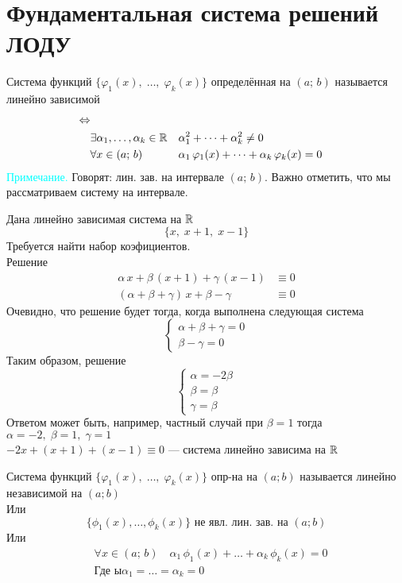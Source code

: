 \section{Фундаментальная система решений ЛОДУ}

\begin{Def}
    Система функций $\{\varphi_1(x),\; \dots, \;\varphi_k(x)\}$ определённая на $(a;\,b)$ называется линейно зависимой
    \begin{align*}
        \Leftrightarrow\\
        &\exists \alpha_1, \dots, \alpha_k \in \mathbb{R}& &\alpha^2_1 + \dots + \alpha^2_k \neq 0\\
        &\forall x \in(a;\,b)& &\alpha_1\,\varphi_1(x)+\dots+\alpha_k\,\varphi_k(x)=0    
    \end{align*}
    \textcolor{cyan}{Примечание.} Говорят: лин. зав. на интервале $(a;\,b)$. Важно отметить, что мы рассматриваем систему на интервале.
\end{Def}

\begin{Example}
    Дана линейно зависимая система на $\mathbb{R}$ 
    \[
        \{x,\; x+1,\; x-1\}
    \]
    Требуется найти набор коэфициентов.\\ 
    Решение
    \begin{align*}
        \alpha\,x+ \beta\,(x+1)+\gamma\,(x-1) &\equiv 0\\
        (\alpha + \beta +\gamma )\,x + \beta - \gamma &\equiv 0
    \end{align*}
    Очевидно, что решение будет тогда, когда выполнена следующая система
    \[
    \begin{cases}
        \alpha + \beta+\gamma=0\\
        \beta - \gamma = 0
    \end{cases}
    \]
    Таким образом, решение
    \[    
    \begin{cases}
        \alpha=-2\beta\\
        \beta=\beta\\
        \gamma = \beta
    \end{cases}
    \]
    Ответом может быть, например, частный случай при $\beta =1$ тогда $\alpha=-2,\; \beta =1, \; \gamma=1$\\
    $-2x+(x+1)+(x-1)\equiv 0$ --- система линейно зависима на $\mathbb{R}$
\end{Example}

\begin{Def}
    Система функций  $\{\varphi_1(x),\; \dots,\; \varphi_k(x)\}$ опр-на на $(a;b)$ называется линейно независимой на $(a;b)$\\
    Или
    \[
        \{ \phi_1(x),\dots,\phi_k(x)\} \text{ не явл. лин. зав. на } (a;b)
    \]
    Или
    \begin{align*}
        &\forall x \in(a;\,b) \quad \alpha_1\,\phi_1(x) + \dots + \alpha_k\,\phi_k(x)=0\\
        &\text{Где }ы \alpha_1 = \dots = \alpha_k = 0\\
    \end{align*}
\end{Def}

